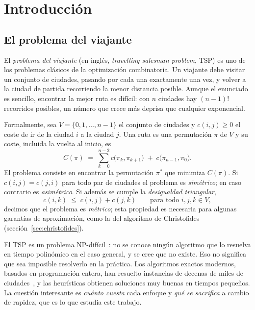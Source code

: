 \chapter{Introducción}\label{cap:intro}

\section{El problema del viajante}

El \emph{problema del viajante} (en inglés, \emph{travelling salesman problem}, TSP) es uno de los problemas clásicos de la optimización
combinatoria. Un viajante debe visitar un conjunto de ciudades, pasando por cada una exactamente una vez, y volver a la ciudad de partida
recorriendo la menor distancia posible. Aunque el enunciado es sencillo, encontrar la mejor ruta es difícil: con $n$ ciudades hay $(n-1)!$ recorridos
posibles, un número que crece más deprisa que cualquier exponencial.

Formalmente, sea $V=\{0,1,\dots,n-1\}$ el conjunto de ciudades y $c(i,j)\ge 0$ el coste de ir de la ciudad $i$ a la ciudad $j$. Una ruta es una permutación
$\pi$ de $V$ y su coste, incluida la vuelta al inicio, es
\begin{equation}\label{eq:coste}
  C(\pi)\;=\;\sum_{k=0}^{n-2} c\bigl(\pi_k,\pi_{k+1}\bigr)\;+\;c\bigl(\pi_{n-1},\pi_0\bigr).
\end{equation}
El problema consiste en encontrar la permutación $\pi^{*}$ que minimiza $C(\pi)$. Si $c(i,j)=c(j,i)$ para todo par de ciudades el problema es
\emph{simétrico}; en caso contrario es \emph{asimétrico}. Si además se cumple la \emph{desigualdad triangular},
\begin{equation}\label{eq:triangular}
  c(i,k)\;\le\;c(i,j)+c(j,k)\qquad\text{para todo }i,j,k\in V,
\end{equation}
decimos que el problema es \emph{métrico}; esta propiedad es necesaria para algunas garantías de aproximación, como la del algoritmo de Christofides
(sección~\ref{sec:christofides}).

El TSP es un problema NP-difícil~\cite{karp1972,garey1979}: no se conoce ningún algoritmo que lo resuelva en tiempo polinómico en el caso
general, y se cree que no existe. Eso no significa que sea imposible resolverlo en la práctica. Los algoritmos exactos modernos, basados en programación
entera, han resuelto instancias de decenas de miles de ciudades~\cite{applegate2006}, y las heurísticas obtienen soluciones muy buenas en
tiempos pequeños. La cuestión interesante es \emph{cuánto cuesta} cada enfoque y \emph{qué se sacrifica} a cambio de rapidez, que es lo que estudia
este trabajo.

